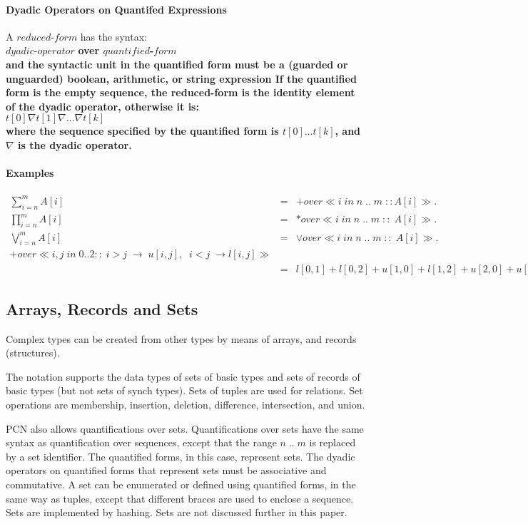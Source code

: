 \paragraph{Dyadic Operators on Quantifed Expressions}

A $reduced$-$form$ has the syntax: \\
$dyadic$-$operator$ \bf over \rm $quantified$-$form$ \\
and the syntactic unit in the quantified form must be a (guarded or unguarded)
boolean, arithmetic, or string expression
If the quantified form is the empty sequence, the reduced-form is
the identity element of the dyadic operator, otherwise it is: \\
$t[0] \nabla t[1] \nabla \ldots \nabla t[k]$ \\
where the sequence specified
by the quantified form is $t[0] \ldots t[k]$,
and $\nabla$ is the dyadic operator.



\paragraph{Examples}

\begin{eqnarray*}
\sum_{i=n}^{m} A[i] & = &
+  over    \ll i \; in \; n \;.. \;m \; :: A[i] \gg . \\
\prod_{i=n}^{m} A[i] & = &
*  over   \ll i \; in \; n \;..\; m \; ::\; A[i] \gg . \\
\bigvee_{i=n}^{m} A[i] & = &
\vee  over   \ll i \; in \; n \;..\; m \; ::\; A[i] \gg . \\
+  over  \ll i,j \; in \; 0 .. 2  :: \; i > j \; \rightarrow \; u[i,j], 
\; \; i < j \; \rightarrow l[i,j] \gg  \\
& = & l[0,1]+l[0,2]+u[1,0]+l[1,2]+u[2,0]+u[2,1].
\end{eqnarray*}


\subsection{Arrays, Records and Sets}
Complex types can be created from 
other types by means of arrays, and records (structures). 

The notation supports the data types of sets of basic types and sets of
records of basic types (but not sets of synch types).
Sets of tuples are used for relations.
Set operations are membership, insertion, deletion, difference,
intersection, and union.

PCN also allows quantifications over sets.
Quantifications over sets have the same syntax as quantification over sequences,
except that the range $n \; .. \;  m$ is replaced by a set identifier.
The quantified forms, in this case, represent sets.
The dyadic operators on quantified forms that represent sets must be
associative and commutative.
A set can be enumerated or defined using quantified forms, in the same
way as tuples, except that different braces are used to enclose a sequence.
Sets are implemented by hashing.
Sets are not discussed further in this paper.


